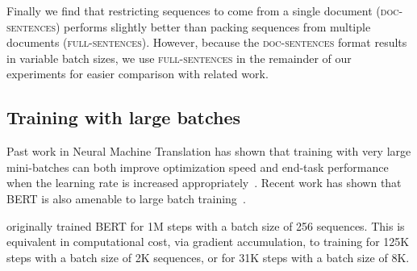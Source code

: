 \documentclass[11pt]{article}
\newcommand{\bertbase}{BERT}
\begin{document}
Finally we find that restricting sequences to come from a single document (\textsc{doc-sentences}) performs slightly better than packing sequences from multiple documents (\textsc{full-sentences}).
However, because the \textsc{doc-sentences} format results in variable batch sizes, we use \textsc{full-sentences} in the remainder of our experiments for easier comparison with related work.


\subsection{Training with large batches}
\label{sec:large_batches}

Past work in Neural Machine Translation has shown that training with very large mini-batches can both improve optimization speed and end-task performance when the learning rate is increased appropriately~\cite{ott2018scaling}.
Recent work has shown that BERT is also amenable to large batch training~\cite{you2019reducing}.

 originally trained \bertbase{} for 1M steps with a batch size of 256 sequences.
This is equivalent in computational cost, via gradient accumulation, to training for 125K steps with a batch size of 2K sequences, or for 31K steps with a batch size of 8K.
\end{document}
